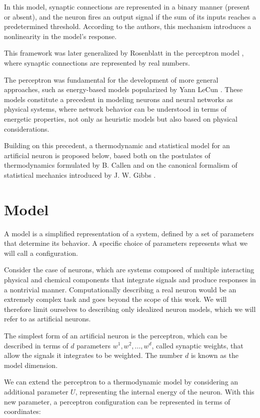 \documentclass[12pt]{article}
\begin{document}
In this model, synaptic connections are represented in a binary manner (present or absent), and the neuron fires an output signal if the sum of its inputs reaches a predetermined threshold. According to the authors, this mechanism introduces a nonlinearity in the model's response.

This framework was later generalized by Rosenblatt in the perceptron model \cite{rosenblatt1958perceptron}, where synaptic connections are represented by real numbers.

The perceptron was fundamental for the development of more general approaches, such as energy-based models popularized by Yann LeCun \cite{lecun2006energy}. These models constitute a precedent in modeling neurons and neural networks as physical systems, where network behavior can be understood in terms of energetic properties, not only as heuristic models but also based on physical considerations.

Building on this precedent, a thermodynamic and statistical model for an artificial neuron is proposed below, based both on the postulates of thermodynamics formulated by B. Callen \cite{callen1985thermodynamics} and on the canonical formalism of statistical mechanics introduced by J. W. Gibbs \cite{gibbs1960statistical}.
\section*{Model}

A model is a simplified representation of a system, defined by a set of parameters that determine its behavior. A specific choice of parameters represents what we will call a configuration.

Consider the case of neurons, which are systems composed of multiple interacting physical and chemical components that integrate signals and produce responses in a nontrivial manner. Computationally describing a real neuron would be an extremely complex task and goes beyond the scope of this work. We will therefore limit ourselves to describing only idealized neuron models, which we will refer to as artificial neurons.

The simplest form of an artificial neuron is the perceptron, which can be described in terms of $d$ parameters $w^1, w^2, ..., w^d$, called synaptic weights, that allow the signals it integrates to be weighted. The number $d$ is known as the model dimension.

We can extend the perceptron to a thermodynamic model by considering an additional parameter $U$, representing the internal energy of the neuron. With this new parameter, a perceptron configuration can be represented in terms of coordinates:
\end{document}

